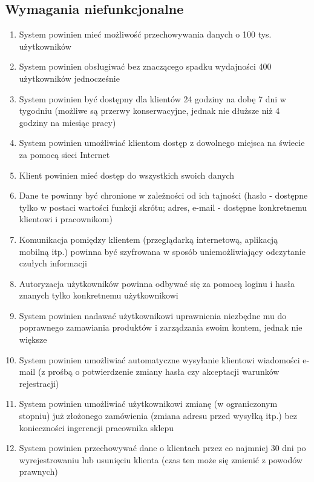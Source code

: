 \newpage
\subsection{Wymagania niefunkcjonalne}

\begin{enumerate}
  \item System powinien mieć możliwość przechowywania danych o 100 tys.
  użytkowników 
  \item System powinien obsługiwać bez znaczącego spadku wydajności 400
  użytkowników jednocześnie 
  \item System powinien być dostępny dla klientów 24 godziny na dobę 7 dni w
  tygodniu (możliwe są przerwy konserwacyjne, jednak nie dłuższe niż 4 godziny na miesiąc pracy) 
  \item System powinien umożliwiać klientom dostęp z dowolnego miejsca na
  świecie za pomocą sieci Internet 
  \item Klient powinien mieć dostęp do wszystkich swoich danych 
  \item Dane te powinny być chronione w zależności od ich tajności (hasło -
  dostępne tylko w postaci wartości funkcji skrótu; adres, e-mail - dostępne konkretnemu klientowi i pracownikom) 
  \item Komunikacja pomiędzy klientem (przeglądarką internetową, aplikacją
  mobilną itp.) powinna być szyfrowana w sposób uniemożliwiający odczytanie czułych informacji
  \item Autoryzacja użytkowników powinna odbywać się za pomocą loginu i hasła
  znanych tylko konkretnemu użytkownikowi 
  \item System powinien nadawać użytkownikowi uprawnienia niezbędne mu do
  poprawnego zamawiania produktów i zarządzania swoim kontem, jednak nie większe 
  \item System powinien umożliwiać automatyczne wysyłanie klientowi wiadomości
  e-mail (z prośbą o potwierdzenie zmiany hasła czy akceptacji warunków rejestracji)
  \item System powinien umożliwiać użytkownikowi zmianę (w ograniczonym stopniu)
  już złożonego zamówienia (zmiana adresu przed wysyłką itp.) bez konieczności ingerencji pracownika sklepu 
  \item System powinien przechowywać dane o klientach przez co najmniej 30 dni
  po wyrejestrowaniu lub usunięciu klienta (czas ten może się zmienić z powodów prawnych)
  
\end{enumerate}